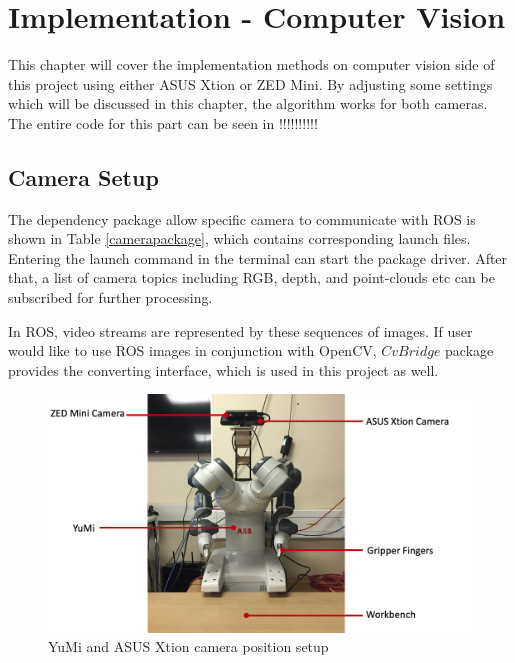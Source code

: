 \chapter{Implementation - Computer Vision}

This chapter will cover the implementation methods on computer vision side of this project using either ASUS Xtion or ZED Mini. By adjusting some settings which will be discussed in this chapter, the algorithm works for both cameras. The entire code for this part can be seen in !!!!!!!!!!

\section{Camera Setup}
The dependency package allow specific camera to communicate with ROS is shown in Table \ref{camerapackage}, which contains corresponding launch files. Entering the launch command in the terminal can start the package driver. After that, a list of camera topics including RGB, depth, and point-clouds etc can be subscribed for further processing. 

\begin{table}[H]
\centering
{}
\caption{The dependency packages and launch commands for Cameras}
\label{camerapackage}
\end{table}

In ROS, video streams are represented by these sequences of images. If user would like to use ROS images in conjunction with OpenCV, $CvBridge$ package provides the converting interface, which is used in this project as well.

\begin{figure}[H]
\centering
\includegraphics[width = \columnwidth]{Implementation/cv/yumicamera.png}
\caption{YuMi and ASUS Xtion camera position setup}
\label{5.1}
\end{figure}

